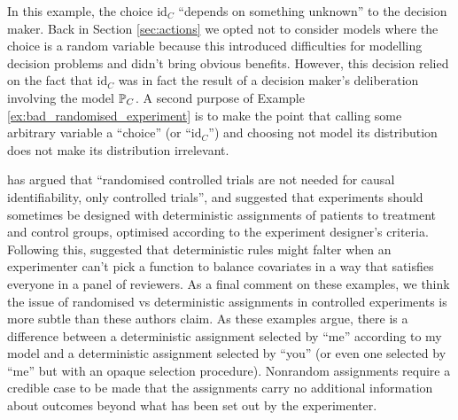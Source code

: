 In this example, the choice $\text{id}_C$ ``depends on something unknown'' to the decision maker. Back in Section \ref{sec:actions} we opted not to consider models where the choice is a random variable because this introduced difficulties for modelling decision problems and didn't bring obvious benefits. However, this decision relied on the fact that $\text{id}_C$ was in fact the result of a decision maker's deliberation involving the model $\mathbb{P}_C$. A second purpose of Example \ref{ex:bad_randomised_experiment} is to make the point that calling some arbitrary variable a ``choice'' (or ``$\text{id}_C$'') and choosing not model its distribution does not make its distribution irrelevant.

\citet{kasy_why_2016} has argued that ``randomised controlled trials are not needed for causal identifiability, only controlled trials'', and suggested that experiments should sometimes be designed with deterministic assignments of patients to treatment and control groups, optimised according to the experiment designer's criteria. Following this, \citet{banerjee_theory_2020} suggested that deterministic rules might falter when an experimenter can't pick a function to balance covariates in a way that satisfies everyone in a panel of reviewers. As a final comment on these examples, we think the issue of randomised vs deterministic assignments in controlled experiments is more subtle than these authors claim. As these examples argue, there is a difference between a deterministic assignment selected by ``me'' according to my model and a deterministic assignment selected by ``you'' (or even one selected by ``me'' but with an opaque selection procedure). Nonrandom assignments require a credible case to be made that the assignments carry no additional information about outcomes beyond what has been set out by the experimenter.




